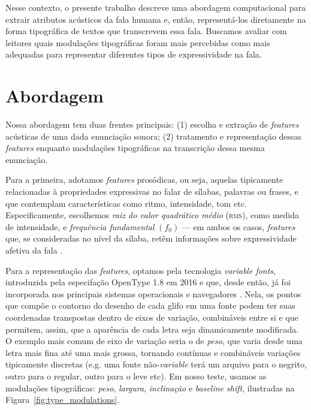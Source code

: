 \documentclass[11pt]{article}
\begin{document}
  Nesse contexto, o presente trabalho descreve uma abordagem computacional para extrair atributos acústicos da fala humana e, então, representá-los diretamente na forma tipográfica de textos que transcrevem essa fala. Buscamos avaliar com leitores quais modulações tipográficas foram mais percebidas como mais adequadas para representar diferentes tipos de expressividade na fala.

  \section{Abordagem}
  \label{sec:abordagem}
  
  Nossa abordagem tem duas frentes principais: (1) escolha e extração de {\itshape features} acústicas de uma dada enunciação sonora; (2) tratamento e representação dessas {\itshape features} enquanto modulações tipográficas na transcrição dessa mesma enunciação.
  
  Para a primeira, adotamos {\itshape features} prosódicas, ou seja, aquelas tipicamente relacionadas à propriedades expressivas no falar de sílabas, palavras ou frases, e que contemplam características como ritmo, intensidade, tom etc. Especificamente, escolhemos {\itshape raiz do valor quadrático médio} \textsc{(rms)}, como medida de intensidade, e {\itshape frequência fundamental} $(f_0)$ --- em ambos os casos, {\itshape features} que, se consideradas no nível da sílaba, retêm informações sobre expressividade afetiva da fala \cite{rao2010characterization}.
  
  Para a representação das {\itshape features}, optamos pela tecnologia {\itshape variable fonts}, introduzida pela especifação OpenType 1.8 \cite{varfontssepcs} em 2016 e que, desde então, já foi incorporada nos principais sistemas operacionais e navegadores \cite{varfontossupport}. Nela, os pontos que compõe o contorno do desenho de cada glifo em uma fonte podem ter suas coordenadas transpostas dentro de eixos de variação, combináveis entre si e que permitem, assim, que a aparência de cada letra seja dinamicamente modificada. O exemplo mais comum de eixo de variação seria o de {\itshape peso}, que varia desde uma letra mais fina até uma mais grossa, tornando contínuas e combináveis variações tipicamente discretas (e.g. uma fonte não-{\itshape variable} terá um arquivo para o negrito, outro para o regular, outro para o leve etc). Em nosso teste, usamos as modulações tipográficas: {\itshape peso}, {\itshape largura}, {\itshape inclinação} e {\itshape baseline shift}, ilustradas na Figura~\ref{fig:type_modulations}.
  
\end{document}
